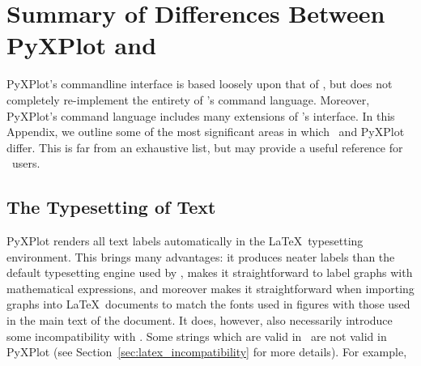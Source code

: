 %
%
%
%
%



\chapter{Summary of Differences Between PyXPlot and \gnuplot}
\label{ch:gnuplot_diffs}

PyXPlot's commandline interface is based loosely upon that of \gnuplot, but
does not completely re-implement the entirety of \gnuplot's command language.
Moreover, PyXPlot's command language includes many extensions of \gnuplot's
interface. In this Appendix, we outline some of the most significant areas in
which \gnuplot\ and PyXPlot differ. This is far from an exhaustive list, but
may provide a useful reference for \gnuplot\ users.

\section{The Typesetting of Text}

PyXPlot renders all text labels automatically in the \LaTeX\ typesetting
environment. This brings many advantages: it produces neater labels than the
default typesetting engine used by \gnuplot, makes it straightforward to label
graphs with mathematical expressions, and moreover makes it straightforward
when importing graphs into \LaTeX\ documents to match the fonts used in figures
with those used in the main text of the document.  It does, however, also
necessarily introduce some incompatibility with \gnuplot.  Some strings which
are valid in \gnuplot\ are not valid in PyXPlot (see
Section~\ref{sec:latex_incompatibility} for more details). For
example,

